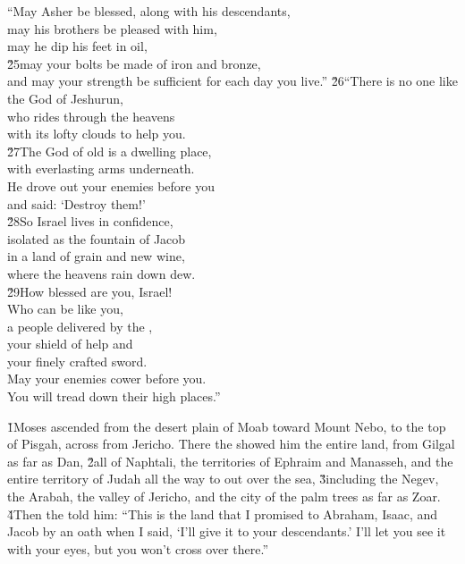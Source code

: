 \begin{poetry}
\poeml ``May Asher be blessed, along with his descendants, \\
\poemll    may his brothers be pleased with him, \\
\poemlll       may he dip his feet in oil, \\
\poeml \v{25}may your bolts be made of iron and bronze, \\
\poemll    and may your strength be sufficient for each day you live.''
\poeml \v{26}``There is no one like the God of Jeshurun, \\
\poemll    who rides through the heavens \\
\poemlll       with its lofty clouds to help you. \\
\poeml \v{27}The God of old is a dwelling place, \\
\poemll    with everlasting arms underneath. \\
\poeml He drove out your enemies before you \\
\poemll    and said: `Destroy them!' \\
\poeml \v{28}So Israel lives in confidence, \\
\poemll    isolated as the fountain of Jacob \\
\poeml in a land of grain and new wine, \\
\poemll    where the heavens rain down dew. \\
\poeml \v{29}How blessed are you, Israel! \\
\poemll    Who can be like you, \\
\poeml a people delivered by the , \\
\poemll    your shield of help and \\
\poemlll       your finely crafted sword. \\
\poeml May your enemies cower before you. \\
\poemll    You will tread down their high places.''
\end{poetry}

\v{1}Moses ascended from the desert plain of Moab toward Mount Nebo, to the top of Pisgah, across from Jericho. There the  showed him the entire land, from Gilgal as far as Dan, \v{2}all of Naphtali, the territories of Ephraim and Manasseh, and the entire territory of Judah all the way to out over the sea, \v{3}including the Negev, the Arabah, the valley of Jericho, and the city of the palm trees as far as Zoar. \v{4}Then the  told him: ``This is the land that I promised to Abraham, Isaac, and Jacob by an oath when I said, `I'll give it to your descendants.' I'll let you see it with your eyes, but you won't cross over there.''

